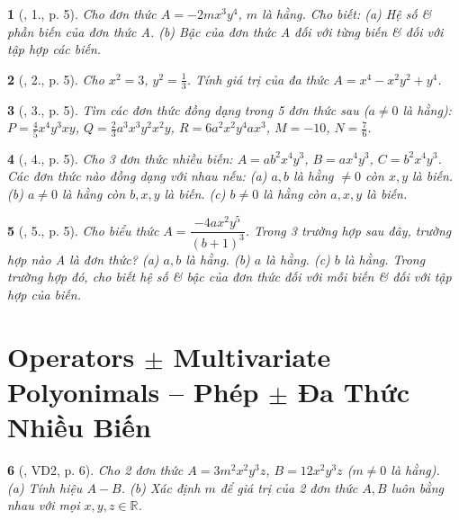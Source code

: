 \documentclass{article}
\newtheorem{baitoan}{}
\begin{document}
\begin{baitoan}[\cite{Tuyen_Toan_8}, 1., p. 5]
	Cho đơn thức $A = -2mx^3y^4$, $m$ là hằng. Cho biết: (a) Hệ số \& phần biến của đơn thức A. (b) Bậc của đơn thức A đối với từng biến \& đối với tập hợp các biến.
\end{baitoan}

\begin{baitoan}[\cite{Tuyen_Toan_8}, 2., p. 5]
	Cho $x^2 = 3$, $y^2 = \frac{1}{3}$. Tính giá trị của đa thức $A = x^4 - x^2y^2 + y^4$.
\end{baitoan}

\begin{baitoan}[\cite{Tuyen_Toan_8}, 3., p. 5]
	Tìm các đơn thức đồng dạng trong 5 đơn thức sau ($a\ne0$ là hằng): $P = \frac{4}{5}x^4y^3xy$, $Q = \frac{2}{3}a^3x^3y^2x^2y$, $R = 6a^2x^2y^4ax^3$, $M = -10$, $N = \frac{7}{6}$.
\end{baitoan}

\begin{baitoan}[\cite{Tuyen_Toan_8}, 4., p. 5]
	Cho 3 đơn thức nhiều biến: $A = ab^2x^4y^3$, $B = ax^4y^3$, $C = b^2x^4y^3$. Các đơn thức nào đồng dạng với nhau nếu: (a) $a,b$ là hằng $\ne0$ còn $x,y$ là biến. (b) $a\ne0$ là hằng còn $b,x,y$ là biến. (c) $b\ne0$ là hằng còn $a,x,y$ là biến.
\end{baitoan}

\begin{baitoan}[\cite{Tuyen_Toan_8}, 5., p. 5]
	Cho biểu thức $A = \dfrac{-4ax^2y^5}{(b + 1)^3}$. Trong 3 trường hợp sau đây, trường hợp nào A là đơn thức? (a) $a,b$ là hằng. (b) $a$ là hằng. (c) $b$ là hằng. Trong trường hợp đó, cho biết hệ số \& bậc của đơn thức đối với mỗi biến \& đối với tập hợp của biến.
\end{baitoan}


\section{Operators $\pm$ Multivariate Polyonimals -- Phép $\pm$ Đa Thức Nhiều Biến}

\begin{baitoan}[\cite{Tuyen_Toan_8}, VD2, p. 6]
	Cho 2 đơn thức $A = 3m^2x^2y^3z$, $B = 12x^2y^3z$ ($m\ne0$ là hằng). (a) Tính hiệu $A - B$. (b) Xác định $m$ để giá trị của 2 đơn thức $A,B$ luôn bằng nhau với mọi $x,y,z\in\mathbb{R}$.
\end{baitoan}
\end{document}
